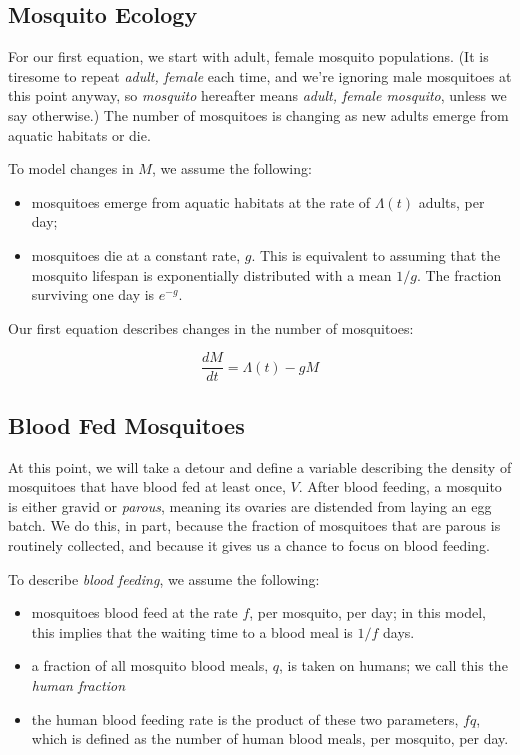 \documentclass[
]{book}
\begin{document}
\hypertarget{mosquito-ecology}{%
\subsection{Mosquito Ecology}\label{mosquito-ecology}}

For our first equation, we start with adult, female mosquito populations. (It is tiresome to repeat \emph{adult, female} each time, and we're ignoring male mosquitoes at this point anyway, so \emph{mosquito} hereafter means \emph{adult, female mosquito}, unless we say otherwise.) The number of mosquitoes is changing as new adults emerge from aquatic habitats or die.

To model changes in \(M\), we assume the following:

\begin{itemize}
\item
  mosquitoes emerge from aquatic habitats at the rate of \(\Lambda(t)\) adults, per day;
\item
  mosquitoes die at a constant rate, \(g\). This is equivalent to assuming that the mosquito lifespan is exponentially distributed with a mean \(1/g\). The fraction surviving one day is \(e^{-g}\).
\end{itemize}

Our first equation describes changes in the number of mosquitoes:

\begin{equation}
\frac{dM}{dt} = \Lambda(t) - g M
\end{equation}

\hypertarget{blood-fed-mosquitoes}{%
\subsection{Blood Fed Mosquitoes}\label{blood-fed-mosquitoes}}

At this point, we will take a detour and define a variable describing the density of mosquitoes that have blood fed at least once, \(V\). After blood feeding, a mosquito is either gravid or \emph{parous}, meaning its ovaries are distended from laying an egg batch. We do this, in part, because the fraction of mosquitoes that are parous is routinely collected, and because it gives us a chance to focus on blood feeding.

To describe \emph{blood feeding}, we assume the following:

\begin{itemize}
\item
  mosquitoes blood feed at the rate \(f\), per mosquito, per day; in this model, this implies that the waiting time to a blood meal is \(1/f\) days.
\item
  a fraction of all mosquito blood meals, \(q\), is taken on humans; we call this the \emph{human fraction}
\item
  the human blood feeding rate is the product of these two parameters, \(fq\), which is defined as the number of human blood meals, per mosquito, per day.
\end{itemize}
\end{document}

